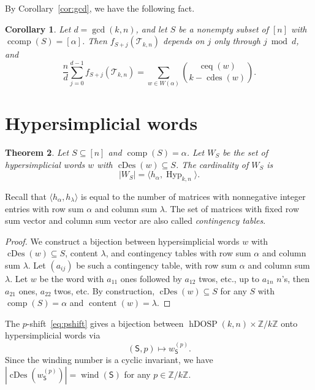 \documentclass[10pt,a4paper]{amsart}
\theoremstyle{plain}
\newtheorem{theorem}{Theorem}[section]
\newtheorem{corollary}[theorem]{Corollary}
\theoremstyle{definition}
\newcommand{\Z}{\mathbb{Z}}
\newcommand{\Tri}{\mathcal{T}_{k,n}}
\newcommand{\dosp}{\mathsf{S}}
\DeclareMathOperator{\comp}{comp}
\DeclareMathOperator{\ccomp}{ccomp}
\DeclareMathOperator{\Hyp}{Hyp}
\DeclareMathOperator{\cDes}{cDes}
\DeclareMathOperator{\wind}{wind}
\DeclareMathOperator{\hDOSP}{hDOSP}
\DeclareMathOperator{\cdes}{cdes}
\DeclareMathOperator{\ceq}{ceq}
\DeclareMathOperator{\content}{content}
\begin{document}
By Corollary~\ref{cor:gcd}, we have the following fact.
\begin{corollary}
	Let $ d = \gcd(k,n) $, and let $ S $
	be a nonempty subset of $ [n] $ with $
		\ccomp(S) = [\alpha] $. Then $ f_{S+j}(\Tri) $ depends on $ j $ only through $ j \bmod d $, and
	\begin{equation}
		\frac{n}{d} \sum_{j=0}^{d-1} f_{S+j}(\Tri) = \sum_{w \in W(\alpha)} \binom{\ceq(w)}{k - \cdes(w)}.
	\end{equation}
\end{corollary}


\section{Hypersimplicial words}\label{sec:hypwords}

\begin{theorem}\label{thm:contingency}
	Let $ S \subseteq [n] $ and $
		\comp(S) = \alpha $. Let $ W_S $
	be the set of hypersimplicial words $ w $ with $\cDes(w) \subseteq S $.
	The cardinality of $ W_S $ is
	\begin{equation}
		|W_S| = \langle h_\alpha, \Hyp_{k,n} \rangle.
	\end{equation}
\end{theorem}
Recall that $\langle h_\alpha, h_\lambda \rangle$ is equal to the number of matrices with nonnegative integer entries with row sum $\alpha$ and column sum $\lambda$. The set of matrices with fixed row sum vector and column sum vector are also called \emph{contingency tables}.
\begin{proof}
	We construct a bijection between hypersimplicial words $w$ with $\cDes(w) \subseteq S$, content $\lambda$, and contingency tables with row sum $\alpha$ and column sum $\lambda$.
	Let $(a_{ij})$ be such a contingency table, with row sum $\alpha$ and column sum $\lambda$.
	Let $w$ be the word with $a_{11}$ ones followed by $a_{12}$ twos, etc., up to $a_{1n}$ $n$'s, then $a_{21}$ ones, $a_{22}$ twos, etc.
	By construction, $\cDes(w) \subseteq S$ for any $S$ with $\comp(S) = \alpha$ and $\content(w) = \lambda$.
\end{proof}

The $p$-shift~\eqref{eq:pshift} gives a bijection between $\hDOSP(k,n) \times \Z/k\Z $ onto hypersimplicial words via
\[
	(\dosp,p) \mapsto w_\dosp^{(p)}.
\]
Since the winding number is a cyclic invariant, we have $ |\cDes(w_\dosp^{(p)})| = \wind(\dosp) $ for any $ p \in \Z/k\Z $.
\end{document}
